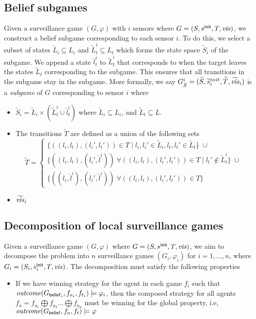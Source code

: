 \subsection{Belief subgames}
Given a surveillance game $(G,\varphi)$ with $i$ sensors where $G = (S,s^{\mathsf{init}},T,\mathit{vis})$, we construct a belief subgame corresponding to each sensor $i$. To do this, we select a subset of states $\widetilde{L}_i \subseteq L_i$ and $\widetilde{L}^i_t \subseteq L_t$ which forms the state space $\widetilde{S}_i$ of the subgame. We append a state $\hat{l}^i_t$ to $\widetilde{L}^i_t$ that corresponds to when the target leaves the states $\widetilde{L}_t$ corresponding to the subgame. This ensures that all transitions in the subgame stay in the subgame. More formally, we say $G^{i}_{\hat{S}} = (\widetilde{S},\widetilde{s}_i^{init},\widetilde{T},\widetilde{\mathit{vis}}_i)$ is a \emph{subgame} of $G$ corresponding to sensor $i$ where 

\begin{itemize}
\item $\widetilde{S}_i= \widetilde{L}_i \times (\widetilde{L}^i_t \cup \hat{l}^i_t)$ where $\widetilde{L}_i\subseteq L_i$, and $\widetilde{L}_t \subseteq L$. 
\item The transitions $\widetilde{T}$ are defined as a union of the following sets  \[\widetilde{T} = \begin{cases}
 \{\left((l_i,l_t),(l_i',l_t')\right) \in T \mid l_i,l_i' \in \widetilde{L}_i, l_t,l_t' \in \widetilde{L}_t \} \; \cup \\
 \{\left((l_i,l_t),(l_i',\hat{l}^i)\right) \; \forall \left((l_i,l_t),(l_i',l_t')\right) \in T \mid l_t' \notin \widetilde{L}_t^i \} \; \cup \\
 \{\left((l_i,\hat{l}^i),(l_i',\hat{l}^i)\right) \; \forall \left((l_i,l_t),(l_i',l_t')\right) \in T \}
\end{cases} \]  
\item $\widetilde{\mathit{vis}}_i$
\end{itemize}



\subsection{Decomposition of local surveillance games}
Given a surveillance game $(G,\varphi)$ where $G = (S,s^{\mathsf{init}},T,\mathit{vis})$, we aim to decompose the problem into $n$ surveillance games $(G_i,\varphi_i)$ for $i = 1,\dots,n$, where $G_i = (S_i,s^{\mathsf{init}}_i,T,\mathit{vis})$. The decomposition must satisfy the following properties
\begin{itemize}
\item If we have winning strategy for the agent in each game $f_i$ such that $\mathit{outcome}(G_{\mathsf{belief}_i},f_{a_i},f_{t_i}) \models \varphi_i$, then the composed strategy for all agents $f_a = f_{a_1} \bigoplus f_{a_2} \dots \bigoplus f_{a_n}$ must be winning for the global property, i.e, $\mathit{outcome}(G_{\mathsf{belief}},f_{a},f_{t}) \models \varphi$
\end{itemize}


